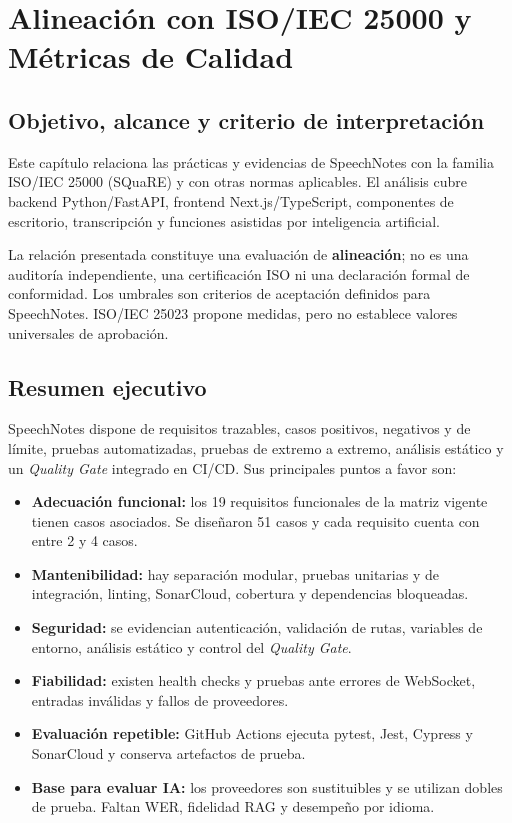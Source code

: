 \chapter{Alineación con ISO/IEC 25000 y Métricas de Calidad}
\label{sec:alineacion-iso-metricas}

\section{Objetivo, alcance y criterio de interpretación}

Este capítulo relaciona las prácticas y evidencias de SpeechNotes con la familia
ISO/IEC 25000 (SQuaRE) y con otras normas aplicables. El análisis cubre backend
Python/FastAPI, frontend Next.js/TypeScript, componentes de escritorio,
transcripción y funciones asistidas por inteligencia artificial.

La relación presentada constituye una evaluación de \textbf{alineación}; no es
una auditoría independiente, una certificación ISO ni una declaración formal de
conformidad. Los umbrales son criterios de aceptación definidos para SpeechNotes.
ISO/IEC 25023 propone medidas, pero no establece valores universales de aprobación.

\section{Resumen ejecutivo}

SpeechNotes dispone de requisitos trazables, casos positivos, negativos y de
límite, pruebas automatizadas, pruebas de extremo a extremo, análisis estático y
un \textit{Quality Gate} integrado en CI/CD. Sus principales puntos a favor son:

\begin{itemize}
    \item \textbf{Adecuación funcional:} los 19 requisitos funcionales de la matriz
    vigente tienen casos asociados. Se diseñaron 51 casos y cada requisito cuenta
    con entre 2 y 4 casos.
    \item \textbf{Mantenibilidad:} hay separación modular, pruebas unitarias y de
    integración, linting, SonarCloud, cobertura y dependencias bloqueadas.
    \item \textbf{Seguridad:} se evidencian autenticación, validación de rutas,
    variables de entorno, análisis estático y control del \textit{Quality Gate}.
    \item \textbf{Fiabilidad:} existen health checks y pruebas ante errores de
    WebSocket, entradas inválidas y fallos de proveedores.
    \item \textbf{Evaluación repetible:} GitHub Actions ejecuta pytest, Jest,
    Cypress y SonarCloud y conserva artefactos de prueba.
    \item \textbf{Base para evaluar IA:} los proveedores son sustituibles y se
    utilizan dobles de prueba. Faltan WER, fidelidad RAG y desempeño por idioma.
\end{itemize}

